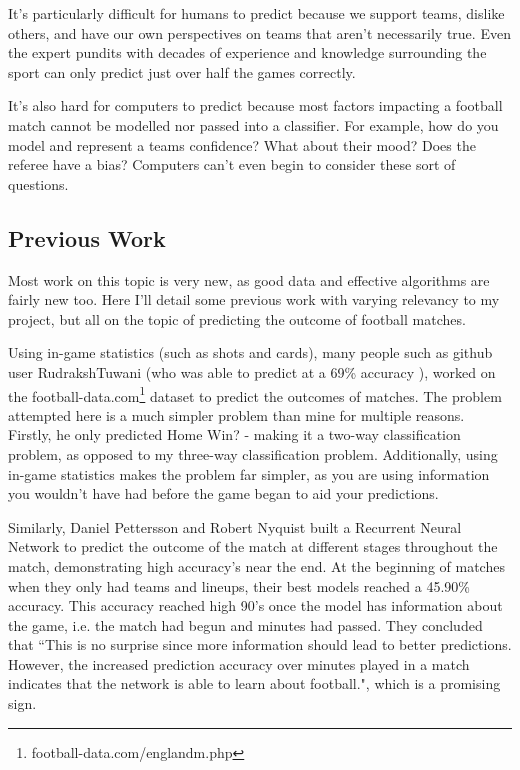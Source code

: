 \documentclass[12pt,a4paper,twoside,openright]{report}
\begin{document}
It's particularly difficult for humans to predict because we support teams, dislike others, and have our own perspectives on teams that aren't necessarily true. Even the expert pundits with decades of experience and knowledge surrounding the sport can only predict just over half the games correctly. 

It's also hard for computers to predict because most factors impacting a football match cannot be modelled nor passed into a classifier. For example, how do you model and represent a teams confidence? What about their mood? Does the referee have a bias? Computers can't even begin to consider these sort of questions.

\subsection{Previous Work}

Most work on this topic is very new, as good data and effective algorithms are fairly new too. Here I'll detail some previous work with varying relevancy to my project, but all on the topic of predicting the outcome of football matches.

Using in-game statistics (such as shots and cards), many people such as github user RudrakshTuwani (who was able to predict at a 69\% accuracy \cite{football-data-predictor}), worked on the football-data.com\footnote{football-data.com/englandm.php} dataset to predict the outcomes of matches. The problem attempted here is a much simpler problem than mine for multiple reasons. Firstly, he only predicted Home Win? - making it a two-way classification problem, as opposed to my three-way classification problem. Additionally, using in-game statistics makes the problem far simpler, as you are using information you wouldn't have had before the game began to aid your predictions.

Similarly, Daniel Pettersson and Robert Nyquist built a Recurrent Neural Network to predict the outcome of the match at different stages throughout the match, demonstrating high accuracy's near the end\cite{football-predictor-RNNs}. At the beginning of matches when they only had teams and lineups, their best models reached a 45.90\% accuracy. This accuracy reached high 90's once the model has information about the game, i.e. the match had begun and minutes had passed. They concluded that ``This is no surprise since more information should lead to better predictions. However, the increased prediction accuracy over minutes played in a match indicates that the network is able to learn about football.", which is a promising sign.
\end{document}
